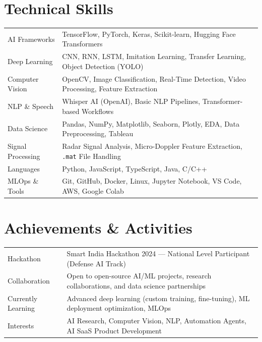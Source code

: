 \documentclass[a4paper,12pt]{article}
\begin{document}
\section{Technical Skills}
\begin{tabularx}{\linewidth}{@{}l X@{}}
AI Frameworks     & \normalsize{TensorFlow, PyTorch, Keras, Scikit-learn, Hugging Face Transformers} \\
Deep Learning     & \normalsize{CNN, RNN, LSTM, Imitation Learning, Transfer Learning, Object Detection (YOLO)} \\
Computer Vision   & \normalsize{OpenCV, Image Classification, Real-Time Detection, Video Processing, Feature Extraction} \\
NLP \& Speech     & \normalsize{Whisper AI (OpenAI), Basic NLP Pipelines, Transformer-based Workflows} \\
Data Science      & \normalsize{Pandas, NumPy, Matplotlib, Seaborn, Plotly, EDA, Data Preprocessing, Tableau} \\
Signal Processing & \normalsize{Radar Signal Analysis, Micro-Doppler Feature Extraction, \texttt{.mat} File Handling} \\
Languages         & \normalsize{Python, JavaScript, TypeScript, Java, C/C++} \\
MLOps \& Tools    & \normalsize{Git, GitHub, Docker, Linux, Jupyter Notebook, VS Code, AWS, Google Colab} \\
\end{tabularx}

\section{Achievements \& Activities}
\begin{tabularx}{\linewidth}{@{}l X@{}}
Hackathon       & Smart India Hackathon 2024 --- National Level Participant (Defense AI Track) \\
Collaboration   & Open to open-source AI/ML projects, research collaborations, and data science partnerships \\
Currently Learning & Advanced deep learning (custom training, fine-tuning), ML deployment optimization, MLOps \\
Interests       & AI Research, Computer Vision, NLP, Automation Agents, AI SaaS Product Development \\
\end{tabularx}

\end{document}
